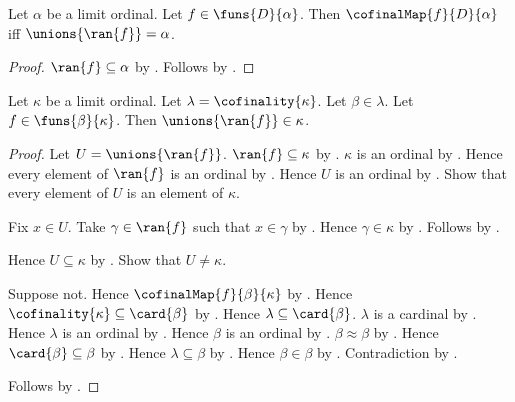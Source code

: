 \begin{corollary}\label{cofinal_map_into_limit_iff_union_range}
    Let $\alpha$ be a limit ordinal.
    Let $f\in\funs{D}{\alpha}$.
    Then $\cofinalMap{f}{D}{\alpha}$ iff
        $\unions{\ran{f}}=\alpha$.
\end{corollary}
\begin{proof}
    $\ran{f}\subseteq\alpha$ by .
    Follows by .
\end{proof}

\begin{lemma}\label{small_domain_range_union_below}
    Let $\kappa$ be a limit ordinal.
    Let $\lambda=\cofinality{\kappa}$.
    Let $\beta\in\lambda$.
    Let $f\in\funs{\beta}{\kappa}$.
    Then $\unions{\ran{f}}\in\kappa$.
\end{lemma}
\begin{proof}
    Let $U=\unions{\ran{f}}$.
    $\ran{f}\subseteq\kappa$ by .
    $\kappa$ is an ordinal by .
    Hence every element of $\ran{f}$ is an ordinal
        by .
    Hence $U$ is an ordinal
        by .
    Show that every element of $U$ is an element of $\kappa$.
    \begin{subproof}
        Fix $x\in U$.
        Take $\gamma\in\ran{f}$ such that $x\in\gamma$
            by .
        Hence $\gamma\in\kappa$ by .
        Follows by .
    \end{subproof}
    Hence $U\subseteq\kappa$ by .
    Show that $U\neq\kappa$.
    \begin{subproof}
        Suppose not.
        Hence $\cofinalMap{f}{\beta}{\kappa}$
            by .
        Hence $\cofinality{\kappa}\subseteq\card{\beta}$
            by .
        Hence $\lambda\subseteq\card{\beta}$.
        $\lambda$ is a cardinal by .
        Hence $\lambda$ is an ordinal by .
        Hence $\beta$ is an ordinal
            by .
        $\beta\approx\beta$ by .
        Hence $\card{\beta}\subseteq\beta$
            by .
        Hence $\lambda\subseteq\beta$
            by .
        Hence $\beta\in\beta$ by .
        Contradiction by .
    \end{subproof}
    Follows by .
\end{proof}

